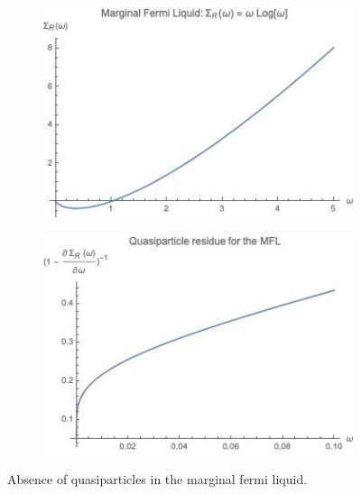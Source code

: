 \begin{figure}
    \centering
    \begin{subfigure}[b]{0.4\textwidth}
    \centering
    \includegraphics[width = \textwidth]{figures/introduction/MFLS.jpeg}
    \end{subfigure}
    \begin{subfigure}[b]{0.4\textwidth}
    \centering
    \includegraphics[width = \textwidth]{figures/introduction/MFLZ.jpeg}
    \end{subfigure}
    \caption{Absence of quasiparticles in the marginal fermi liquid.}
    \label{fig:MFLZ}
\end{figure}

